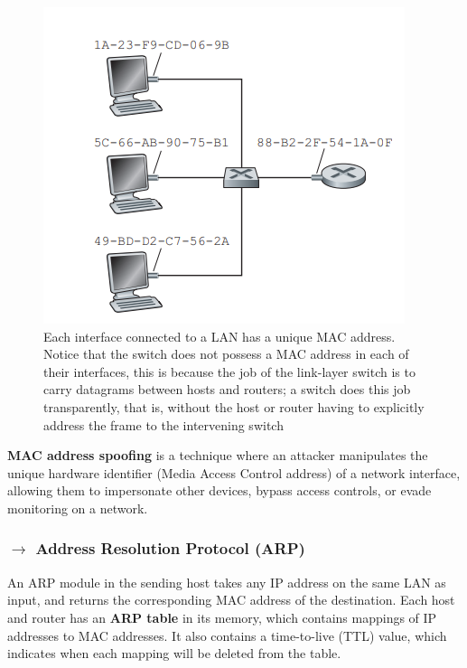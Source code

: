 \vspace{-1em}
\begin{figure}[H]
    \centering
    \includegraphics[width = 0.6\linewidth]{img/5/MAC-address-example.png}
    \caption{Each interface connected to a LAN has a unique MAC address. Notice that the switch does not possess a MAC address in each of their interfaces, this is because the job of the link-layer switch is to carry datagrams between hosts and routers; a switch does this job transparently, that is, without the host or router having to explicitly address the frame to the intervening switch}
    \label{fig:MAC-address-example}
\end{figure}

\begin{mdframed}
    \textbf{MAC address spoofing} is a technique where an attacker manipulates the unique hardware identifier (Media Access Control address) of a network interface, allowing them to impersonate other devices, bypass access controls, or evade monitoring on a network.
\end{mdframed}

\clearpage
\subsubsection[5.4.1 Address Resolution Protocol (ARP)]{$\rightarrow$ Address Resolution Protocol (ARP)}

\noindent An ARP module in the sending host takes any IP address on the same LAN as input, and returns the corresponding MAC address of the destination. Each host and router has an \textbf{ARP table} in its memory, which contains mappings of IP addresses to MAC addresses. It also contains a time-to-live (TTL) value, which indicates when each mapping will be deleted from the table.

